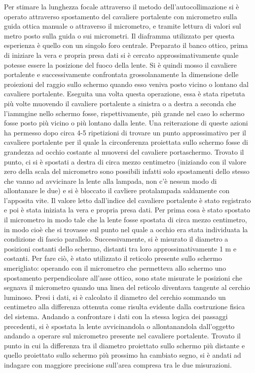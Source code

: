  Per stimare la lunghezza focale attraverso il metodo dell'autocollimazione si è operato attraverso spostamento del cavaliere
 portalente con micrometro sulla guida ottica manuale o attraverso il micrometro, e tramite lettura di valori sul metro posto sulla
 guida o sui micrometri. Il diaframma utilizzato per questa esperienza è quello con un singolo foro centrale.
 Preparato il banco ottico, prima di iniziare la vera e propria presa dati si è cercato
 approssimativamente quale potesse essere la posizione del fuoco della lente. Si è quindi mosso il cavaliere portalente e
 successivamente confrontata grossolanamente la dimensione delle proiezioni del raggio sullo schermo quando esso veniva posto vicino
 o lontano dal cavaliere portalente. Eseguita una volta questa operazione, essa è stata ripetuta più volte muovendo il cavaliere
 portalente a sinistra o a destra a seconda che l'iammgine nello schermo fosse, rispettivamente, più grande nel caso lo schermo
 fosse posto più vicino o più lontano dalla lente. Una reiterazione di queste azioni ha permesso dopo circa 4-5 ripetizioni di
 trovare un punto approssimativo per il cavaliere portalente per il quale la circonferenza proiettata sullo schermo fosse di grandezza
 ad occhio costante al muoversi del cavaliere portaschermo. Trovato il punto, ci si è spostati a destra di circa mezzo
 centimetro (iniziando con il valore zero della scala del micrometro sono possibili infatti solo spostamenti dello stesso che vanno
 ad avvicinare la lente alla lampada, non c'è nessun modo di allontanare le due) e si è bloccato il cavliere protalampada saldamente
 con l'apposita vite. Il valore letto dall'indice del cavaliere portalente è stato registrato e poi è stata iniziata la vera e propria
 presa dati. Per prima cosa è stato spostato il micrometro in modo tale che la lente fosse spostata di circa mezzo centimetro, in
 modo cioè che si trovasse sul punto nel quale a occhio era stata individuata la condizione di fascio parallelo. Successivamente,
 si è misurato il diametro a posizioni costanti dello schermo, distanti tra loro approssimativamente 1 m e costanti. Per fare ciò,
 è stato utilizzato il reticolo presente sullo schermo smerigliato: operando con il micrometro che permetteva allo schermo uno
 spostamento perpendicolare all'asse ottico, sono state misurate le posizioni che segnava il micrometro quando una linea del reticolo
 diventava tangente al cerchio luminoso. Presi i dati, si è calcolato il diametro del cerchio sommando un centimetro alla differenza
 ottenuta come risulta evidente dalla costruzione fisica del sistema.
 Andando a confrontare i dati con la stessa logica dei passaggi precedenti, si è spostata la lente avvicinandola o allontanandola
 dall'oggetto andando a
 operare sul micrometro presente nel cavaliere portalente. Trovato il punto in cui la differenza tra il diametro proiettato sullo
 schermo più distante e quello proiettato sullo schermo più prossimo ha cambiato segno, si è andati ad indagare con maggiore
 precisione sull'area compresa tra le due misurazioni.

